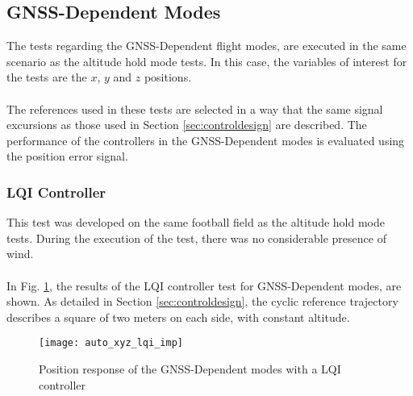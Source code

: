 \subsection{GNSS-Dependent Modes}
The tests regarding the GNSS-Dependent flight modes, are executed in the same scenario as the altitude hold mode tests. In this case, the variables of interest for the tests are the $ x $, $y $ and $ z $ positions.
\\\\
The references used in these tests are selected in a way that the same signal excursions as those used in Section \ref{sec:controldesign} are described. The performance of the controllers in the GNSS-Dependent modes is evaluated using the position error signal.

\subsubsection{LQI Controller}
This test was developed on the same football field as the altitude hold mode tests. During the execution of the test, there was no considerable presence of wind.
\\\\
In Fig. \ref{fig:auto_xyz_lqi_imp}, the results of the LQI controller test for GNSS-Dependent modes, are shown. As detailed in Section \ref{sec:controldesign}, the cyclic reference trajectory describes a square of two meters on each side, with constant altitude. 
\begin{figure}[h]
	\begin{center}
	\texttt{[image: auto\_xyz\_lqi\_imp]}
	\caption{Position response of the GNSS-Dependent modes with a LQI controller}
	\label{fig:auto_xyz_lqi_imp}
	\end{center}
	\end{figure}
	


